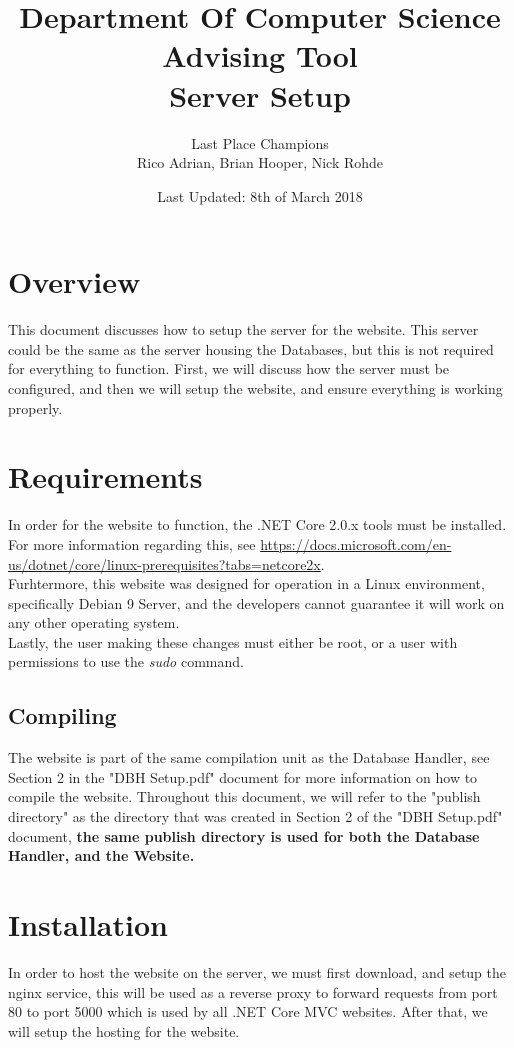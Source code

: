 \documentclass[letterpaper]{article}
\title{Department Of Computer Science Advising Tool \\ Server Setup}
\author{Last Place Champions \\ Rico Adrian, Brian Hooper, Nick Rohde}
\date{Last Updated: 8th of March 2018}
\begin{document}
	\maketitle
	\pagebreak
	\tableofcontents
	\pagebreak
	
	\section{Overview}
	This document discusses how to setup the server for the website. This server could be the same as the server housing the Databases, but this is not required for everything to function. First, we will discuss how the server must be configured, and then we will setup the website, and ensure everything is working properly.
	
	\section{Requirements}
	In order for the website to function, the .NET Core 2.0.x tools must be installed. For more information regarding this, see \url{https://docs.microsoft.com/en-us/dotnet/core/linux-prerequisites?tabs=netcore2x}.\\ Furhtermore, this website was designed for operation in a Linux environment, specifically Debian 9 Server, and the developers cannot guarantee it will work on any other operating system. \\ Lastly, the user making these changes must either be root, or a user with permissions to use the \textit{sudo} command.
	
	\subsection{Compiling}
	The website is part of the same compilation unit as the Database Handler, see Section 2 in the "DBH Setup.pdf" document for more information on how to compile the website. Throughout this document, we will refer to the "publish directory" as the directory that was created in Section 2 of the "DBH Setup.pdf" document, \textbf{the same publish directory is used for both the Database Handler, and the Website.}
	
	\section{Installation}
	In order to host the website on the server, we must first download, and setup the nginx service, this will be used as a reverse proxy to forward requests from port 80 to port 5000 which is used by all .NET Core MVC websites. After that, we will setup the hosting for the website.
	
\end{document}
